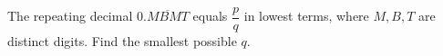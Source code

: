 The repeating decimal $0.\overline{MBMT}$ equals $\dfrac pq$ in lowest terms, where $M,B,T$ are distinct digits. Find the smallest possible $q$.
